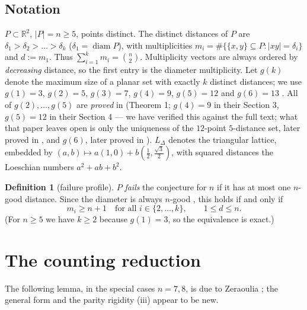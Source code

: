 \documentclass[11pt]{article}
\theoremstyle{definition}
\newtheorem{definition}[theorem]{Definition}
\theoremstyle{remark}
\newcommand{\R}{\mathbb{R}}
\newcommand{\Lat}{L_{\Delta}}
\DeclareMathOperator{\diam}{diam}
\begin{document}
\subsection*{Notation}

$P \subset \R^2$, $|P| = n \ge 5$, points distinct. The distinct distances of $P$ are
$\delta_1 > \delta_2 > \dots > \delta_k$ ($\delta_1 = \diam P$), with multiplicities
$m_i = \#\{\{x,y\} \subseteq P : |xy| = \delta_i\}$ and $d := m_1$. Thus
$\sum_{i=1}^k m_i = \binom{n}{2}$. Multiplicity vectors are always ordered by
\emph{decreasing} distance, so the first entry is the diameter multiplicity. Let $g(k)$
denote the maximum size of a planar set with exactly $k$ distinct distances; we use
$g(1)=3$, $g(2)=5$, $g(3)=7$, $g(4)=9$, $g(5)=12$ \cite{ErFi96} and $g(6)=13$
\cite{Wei12}. All of $g(2), \dots, g(5)$ are \emph{proved} in \cite{ErFi96} (Theorem 1;
$g(4)=9$ in their Section 3, $g(5)=12$ in their Section 4 --- we have verified this
against the full text; what that paper leaves open is only the uniqueness of the
$12$-point $5$-distance set, later proved in \cite{Shinohara08}, and $g(6)$, later
proved in \cite{Wei12}). $\Lat$ denotes the triangular lattice, embedded by
$(a,b) \mapsto a(1,0) + b(\tfrac12, \tfrac{\sqrt3}{2})$, with squared distances the
Loeschian numbers $a^2+ab+b^2$.

\begin{definition}[failure profile]\label{def:failure}
$P$ \emph{fails} the conjecture for $n$ if it has at most one $n$-good distance. Since the
diameter is always $n$-good \cite{HoPa34}, this holds if and only if
\[
m_i \ge n+1 \quad \text{for all } i \in \{2, \dots, k\}, \qquad 1 \le d \le n .
\]
(For $n \ge 5$ we have $k \ge 2$ because $g(1) = 3$, so the equivalence is exact.)
\end{definition}

\section{The counting reduction}\label{sec:counting}

The following lemma, in the special cases $n = 7, 8$, is due to Zeraoulia
\cite{Zeraoulia26}; the general form and the parity rigidity (iii) appear to be new.
\end{document}
